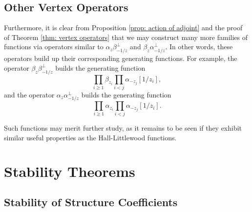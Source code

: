 \documentclass[12pt]{amsart}%
\theoremstyle{remark}
\theoremstyle{definition}
\begin{document}
    \subsection{Other Vertex Operators}

    Furthermore, it is clear from Proposition \ref{prop: action of adjoint} and the proof of Theorem \ref{thm: vertex operators} that we may construct many more families of functions via operators similar to $\alpha_z\beta_{-1/z}^\perp$ and $\beta_z\alpha_{-1/z}^\perp$. In other words, these operators build up their corresponding generating functions. For example, the operator $\beta_z\beta_{-1/z}^\perp$ builds the generating function
    \[\prod_{i\geq1}\beta_{z_i}\prod_{i<j}\alpha_{-z_j}[1/z_i],\]
    and the operator $\alpha_z\alpha_{-1/z}^\perp$ builds the generating function
    \[\prod_{i\geq1}\alpha_{z_i}\prod_{i<j}\alpha_{-z_j}[1/z_i].\]
    
    Such functions may merit further study, as it remains to be seen if they exhibit similar useful properties as the Hall-Littlewood functions.


    \section{Stability Theorems}

    \subsection{Stability of Structure Coefficients}

\end{document}
